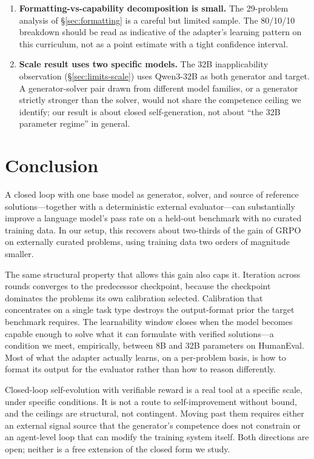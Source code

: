 \documentclass[11pt,a4paper]{article}
\begin{document}
\begin{enumerate}
    \item[\textbf{L5}] \textbf{Formatting-vs-capability decomposition is small.} The 29-problem analysis of \S\ref{sec:formatting} is a careful but limited sample. The 80/10/10 breakdown should be read as indicative of the adapter's learning pattern on this curriculum, not as a point estimate with a tight confidence interval.
    \item[\textbf{L6}] \textbf{Scale result uses two specific models.} The 32B inapplicability observation (\S\ref{sec:limits-scale}) uses Qwen3-32B as both generator and target. A generator-solver pair drawn from different model families, or a generator strictly stronger than the solver, would not share the competence ceiling we identify; our result is about closed self-generation, not about ``the 32B parameter regime'' in general.
\end{enumerate}

\section{Conclusion}
\label{sec:conclusion}

A closed loop with one base model as generator, solver, and source of reference solutions---together with a deterministic external evaluator---can substantially improve a language model's pass rate on a held-out benchmark with no curated training data.
In our setup, this recovers about two-thirds of the gain of GRPO on externally curated problems, using training data two orders of magnitude smaller.

The same structural property that allows this gain also caps it.
Iteration across rounds converges to the predecessor checkpoint, because the checkpoint dominates the problems its own calibration selected.
Calibration that concentrates on a single task type destroys the output-format prior the target benchmark requires.
The learnability window closes when the model becomes capable enough to solve what it can formulate with verified solutions---a condition we meet, empirically, between 8B and 32B parameters on HumanEval.
Most of what the adapter actually learns, on a per-problem basis, is how to format its output for the evaluator rather than how to reason differently.

Closed-loop self-evolution with verifiable reward is a real tool at a specific scale, under specific conditions.
It is not a route to self-improvement without bound, and the ceilings are structural, not contingent.
Moving past them requires either an external signal source that the generator's competence does not constrain or an agent-level loop that can modify the training system itself.
Both directions are open; neither is a free extension of the closed form we study.
\end{document}

